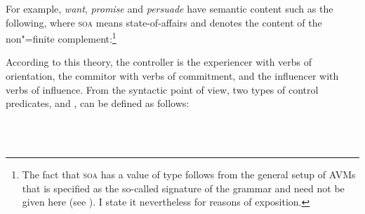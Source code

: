 For example, \emph{want}, \emph{promise} and \emph{persuade} have semantic content such as the
following, where \textsc{soa} means state-of-affairs and denotes the content of the non"=finite
complement:\footnote{
  The fact that \textsc{soa} has a value of type  follows
  from the general setup of AVMs that is specified as the so-called signature of the grammar and need not be
  given here (see ). I state it
  nevertheless for reasons of exposition.
}

\eal
\ex 
{}
\ex
\ex
\zl

According to this theory, the controller is the experiencer with verbs of orientation, the commitor
with verbs of commitment, and the influencer with verbs of influence. From the syntactic point of
view, two types of control predicates,  and , can be
defined as follows:

\eal
\label{cont}
\ex
\label{subj-contr-lx}
 \impl\\
\avm{ [ \argst  < \NPi, \ldots, [subj & < [ind & $i$ ] > ] > ]}
\ex
{} \impl\\ 
\zl


